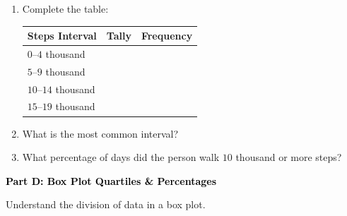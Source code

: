 \documentclass[12pt, letterpaper, fleqn]{article}
\newcommand{\blank}{\underline{\hspace{2.2cm}}}
\begin{document}
\begin{enumerate}[itemsep=2.5cm, leftmargin=0.6cm]
\item Complete the table:
\vspace{0.5cm}
\begin{center}
\begin{tabular}{|l|c|r|}
\hline
\textbf{Steps Interval} & \textbf{Tally} & \textbf{Frequency} \\ \hline
$0\text{--}4$ thousand & & \blank \\ \hline
$5\text{--}9$ thousand & & \blank \\ \hline
$10\text{--}14$ thousand & & \blank \\ \hline
$15\text{--}19$ thousand & & \blank \\
\hline
\end{tabular}
\end{center}
\vspace{0.5cm}

\item What is the most common interval? \\
\vspace{1cm}

\item What percentage of days did the person walk $10$ thousand or more steps? \\
\vspace{1cm}
\end{enumerate}

\newpage

\begin{tcolorbox}[colback=black!10]
    \large\textcolor{black}{\textbf{Part D: Box Plot Quartiles \& Percentages}}
\end{tcolorbox}

\vspace{3mm}

\noindent
Understand the division of data in a box plot.

\vspace{5mm}
\end{document}
